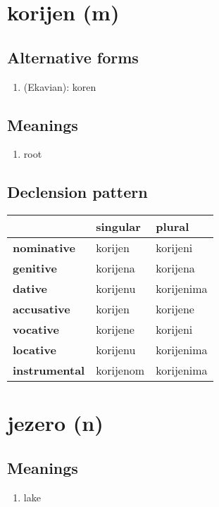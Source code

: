 \filbreak
\section{korijen (m)}
\subsection*{Alternative forms}
\begin{enumerate}
\item (Ekavian): koren
\end{enumerate}
\subsection*{Meanings}
\begin{enumerate}
\item root
\end{enumerate}
\subsection*{Declension pattern}
\begin{tabularx}{\linewidth}{Xll}
\toprule
{} &   singular &      plural \\
\midrule
\textbf{nominative  } &    korijen &    korijeni \\
\textbf{genitive    } &   korijena &    korijena \\
\textbf{dative      } &   korijenu &  korijenima \\
\textbf{accusative  } &    korijen &    korijene \\
\textbf{vocative    } &   korijene &    korijeni \\
\textbf{locative    } &   korijenu &  korijenima \\
\textbf{instrumental} &  korijenom &  korijenima \\
\bottomrule
\end{tabularx}

\filbreak
\section{jezero (n)}
\subsection*{Meanings}
\begin{enumerate}
\item lake
\end{enumerate}
